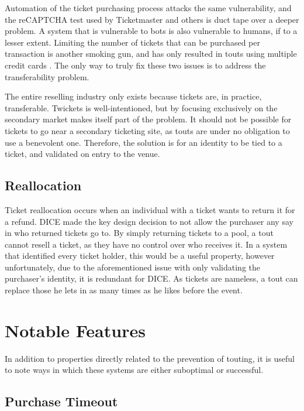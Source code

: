 \documentclass[12pt,a4paper]{bhamdissertation}
\begin{document}
Automation of the ticket purchasing process attacks the same vulnerability, and the reCAPTCHA \cite{T167} test used by Ticketmaster and others is duct tape over a deeper problem. A system that is vulnerable to bots is also vulnerable to humans, if to a lesser extent. Limiting the number of tickets that can be purchased per transaction is another smoking gun, and has only resulted in touts using multiple credit cards \cite{DJ16}. The only way to truly fix these two issues is to address the transferability problem.

The entire reselling industry only exists because tickets are, in practice, transferable. Twickets \cite{Tw161} is well-intentioned, but by focusing exclusively on the secondary market makes itself part of the problem. It should not be possible for tickets to go near a secondary ticketing site, as touts are under no obligation to use a benevolent one. Therefore, the solution is for an identity to be tied to a ticket, and validated on entry to the venue.

\subsection{Reallocation}

Ticket reallocation occurs when an individual with a ticket wants to return it for a refund. DICE made the key design decision to not allow the purchaser any say in who returned tickets go to. By simply returning tickets to a pool, a tout cannot resell a ticket, as they have no control over who receives it. In a system that identified every ticket holder, this would be a useful property, however unfortunately, due to the aforementioned issue with only validating the purchaser's identity, it is redundant for DICE. As tickets are nameless, a tout can replace those he lets in as many times as he likes before the event. 

\section{Notable Features}

In addition to properties directly related to the prevention of touting, it is useful to note ways in which these systems are either suboptimal or successful.

\subsection{Purchase Timeout}
\end{document}
